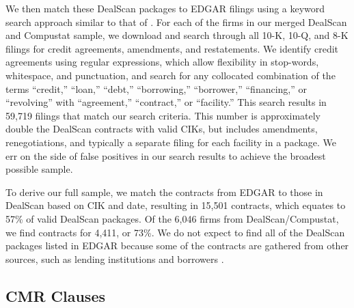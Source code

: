 \documentclass[a4paper,12pt]{article}
\begin{document}
We then match these DealScan packages to EDGAR filings using a keyword search approach similar to that of \cite{Nini_2009}.
For each of the firms in our merged DealScan and Compustat sample, we download and search through all 10-K, 10-Q, and 8-K filings for credit agreements, amendments, and restatements.
We identify credit agreements using regular expressions, which allow flexibility in stop-words, whitespace, and punctuation, and search for any collocated combination of the terms  ``credit,'' ``loan,'' ``debt,'' ``borrowing,'' ``borrower,'' ``financing,'' or ``revolving'' with ``agreement,'' ``contract,'' or ``facility.''
This search results in 59,719 filings that match our search criteria.
This number is approximately double the DealScan contracts with valid CIKs, but includes amendments, renegotiations, and typically a separate filing for each facility in a package.
We err on the side of false positives in our search results to achieve the broadest possible sample.


To derive our full sample, we match the contracts from EDGAR to those in DealScan based on CIK and date, resulting in 15,501 contracts, which equates to 57\% of valid DealScan packages.
Of the 6,046 firms from DealScan/Compustat, we find contracts for 4,411, or 73\%.
We do not expect to find all of the DealScan packages listed in EDGAR because some of the contracts are gathered from other sources, such as lending institutions and borrowers \citep{Nini_2009, Bradley_2015}.



\subsection{CMR Clauses}
\end{document}
